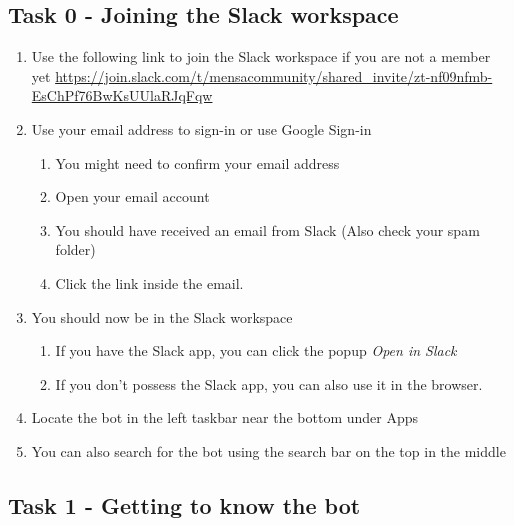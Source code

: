
\subsection*{Task 0 - Joining the Slack workspace}
    
\begin{enumerate}
    \item Use the following link
    to join the Slack workspace if you are not a member yet
    \url{https://join.slack.com/t/mensacommunity/shared_invite/zt-nf09nfmb-EsChPf76BwKsUUlaRJqFqw}
    \item Use your email address to sign-in or use Google Sign-in
    \begin{enumerate}
    \item You might need to confirm your email address
    \item Open your email account
    \item You should have received an email from Slack (Also check your spam folder)
    \item  Click the link inside the email. 
    \end{enumerate}
    \item You should now be  in the Slack workspace
    \begin{enumerate}
        \item If you have the Slack app, you can click the popup \emph{Open in Slack}
        \item If you don't possess the Slack app, you can also use it in the browser.
    \end{enumerate}
    \item Locate the bot in the left taskbar near the bottom under Apps
    \item You can also search for the bot using the search bar on the top in the middle
\end{enumerate}



      
\subsection*{Task 1 - Getting to know the bot}
